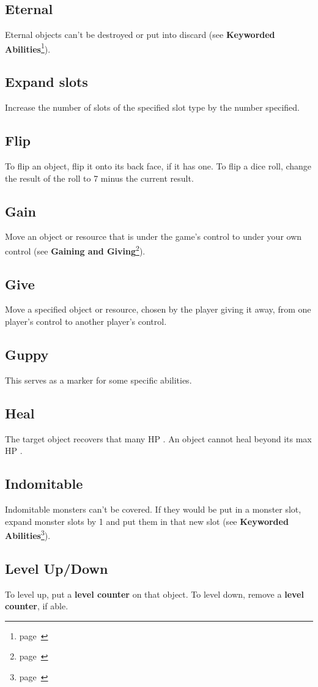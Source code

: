 \documentclass[
  fontsize=10pt,
  paper=a5,
  version=last,
  chapterprefix=true,
  bindingoffset=5mm,
  ]{scrbook}
\newcommand*{\inlineicon}[1]{%
    \raisebox{-.3\baselineskip}{%
        \smash{%
            \texttt{[image: \#1]}%
        }%
    }%
}
\newcommand{\heart}{\inlineicon{./assets/ms-heart.png}}
\begin{document}
    \subsection*{Eternal}
    Eternal objects can’t be destroyed or put into discard (see \textbf{Keyworded Abilities}\footnote{page~\pageref{keyworded}}).
    \subsection*{Expand slots}
    Increase the number of slots of the specified slot type by the number specified.
    \subsection*{Flip}
    To flip an object, flip it onto its back face, if it has one. To flip a dice roll, change the result of the roll to 7 minus the current result.
    \subsection*{Gain}
    Move an object or resource that is under the game’s control to under your own control (see \textbf{Gaining and Giving}\footnote{page~\pageref{gaining}}).
    \subsection*{Give}
    Move a specified object or resource, chosen by the player giving it away, from one player’s control to another player’s control.
    \subsection*{Guppy}
    This serves as a marker for some specific abilities.
    \subsection*{Heal}
    The target object recovers that many HP\heart. An object cannot heal beyond its max HP\heart.
    \subsection*{Indomitable}
    Indomitable monsters can’t be covered. If they would be put in a monster slot, expand monster slots by 1 and put them in that new slot (see \textbf{Keyworded Abilities}\footnote{page~\pageref{keyworded}}).
    \subsection*{Level Up/Down}
    To level up, put a \textbf{level counter} on that object. To level down, remove a \textbf{level counter}, if able.
\end{document}
